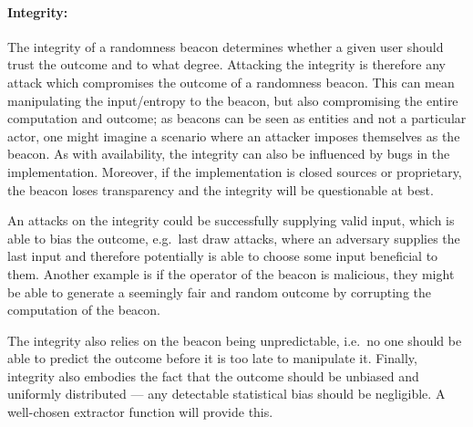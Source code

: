     \paragraph{Integrity:}
        The integrity of a randomness beacon determines whether a given user should trust the outcome and to what degree.
        Attacking the integrity is therefore any attack which compromises the outcome of a randomness beacon.
        This can mean manipulating the input/entropy to the beacon, but also compromising the entire computation and outcome;
        as beacons can be seen as entities and not a particular actor, one might imagine a scenario where an attacker imposes themselves as the beacon.
        As with availability, the integrity can also be influenced by bugs in the implementation.
        Moreover, if the implementation is closed sources or proprietary, the beacon loses transparency and the integrity will be questionable at best.

        An attacks on the integrity could be successfully supplying valid input, which is able to bias the outcome, e.g.\ last draw attacks, where an adversary supplies the last input and therefore potentially is able to choose some input beneficial to them. Another example is
        if the operator of the beacon is malicious, they might be able to generate a seemingly fair and random outcome by corrupting the computation of the beacon.

        The integrity also relies on the beacon being unpredictable, i.e.\ no one should be able to predict the outcome before it is too late to manipulate it.
        Finally, integrity also embodies the fact that the outcome should be unbiased and uniformly distributed --- any detectable statistical bias should be negligible. A well-chosen extractor function will provide this.

